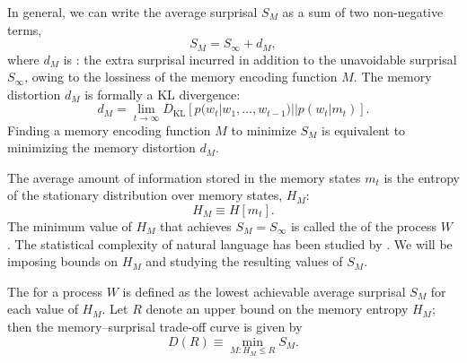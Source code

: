 
In general, we can write the average surprisal $S_M$ as a sum of two non-negative terms,
\begin{equation}
    S_M = S_\infty + d_M,
\end{equation}
where $d_M$ is : the extra surprisal incurred in addition to the unavoidable surprisal $S_\infty$, owing to the lossiness of the memory encoding function $M$. 
The memory distortion $d_M$ is formally a KL divergence:
\begin{equation}
    \label{eq:memory-distortion}
    d_M = \lim_{t \rightarrow \infty} D_{\text{KL}} [ p(w_t | w_1, \dots, w_{t-1}) || p(w_t | m_t)].
\end{equation}
Finding a memory encoding function $M$ to minimize $S_M$ is equivalent to minimizing the memory distortion $d_M$.

The average amount of information stored in the memory states $m_t$ is the entropy of the stationary distribution over memory states, $H_M$:
\begin{equation}
    \label{eq:memory-entropy}
    H_M \equiv H[m_t].
\end{equation}
The minimum value of $H_M$ that achieves $S_M = S_\infty$ is called the  of the process $W$ \citep{feldman-measures-1998}. The statistical complexity of natural language has been studied by \citet{hahn2019neural}. We will be imposing bounds on $H_M$ and studying the resulting values of $S_M$. 

\begin{definition}
The  for a process $W$ is defined as the lowest achievable average surprisal $S_M$ for each value of $H_M$. Let $R$ denote an upper bound on the memory entropy $H_M$; then the memory--surprisal trade-off curve is given by
\begin{equation}
    \label{eq:ms-formal}
    D(R) \equiv \min_{M : H_M \le R} S_M.
\end{equation}
\end{definition}

